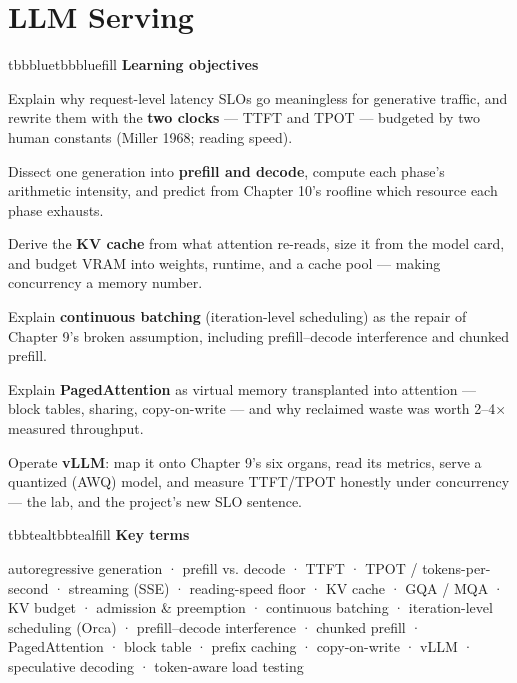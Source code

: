 \setcounter{chapter}{10}
\chapter{LLM Serving}

\begin{calloutbox}{tbbblue}{tbbbluefill}
{\normalsize\bfseries\color{tbbblue}Learning objectives}\par\vspace{3pt}
\begin{tbbitemize}
  \item Explain why request-level latency SLOs go meaningless for generative traffic, and rewrite them with the \textbf{two clocks} — TTFT and TPOT — budgeted by two human constants (Miller 1968; reading speed).
  \item Dissect one generation into \textbf{prefill and decode}, compute each phase's arithmetic intensity, and predict from Chapter 10's roofline which resource each phase exhausts.
  \item Derive the \textbf{KV cache} from what attention re-reads, size it from the model card, and budget VRAM into weights, runtime, and a cache pool — making concurrency a memory number.
  \item Explain \textbf{continuous batching} (iteration-level scheduling) as the repair of Chapter 9's broken assumption, including prefill–decode interference and chunked prefill.
  \item Explain \textbf{PagedAttention} as virtual memory transplanted into attention — block tables, sharing, copy-on-write — and why reclaimed waste was worth 2–4× measured throughput.
  \item Operate \textbf{vLLM}: map it onto Chapter 9's six organs, read its metrics, serve a quantized (AWQ) model, and measure TTFT/TPOT honestly under concurrency — the lab, and the project's new SLO sentence.
\end{tbbitemize}
\end{calloutbox}

\vspace{2.5pt}

\begin{calloutbox}{tbbteal}{tbbtealfill}
{\normalsize\bfseries\color{tbbteal}Key terms}\par\vspace{3pt}
autoregressive generation · prefill vs. decode · TTFT · TPOT / tokens-per-second · streaming (SSE) · reading-speed floor · KV cache · GQA / MQA · KV budget · admission \& preemption · continuous batching · iteration-level scheduling (Orca) · prefill–decode interference · chunked prefill · PagedAttention · block table · prefix caching · copy-on-write · vLLM · speculative decoding · token-aware load testing
\end{calloutbox}

